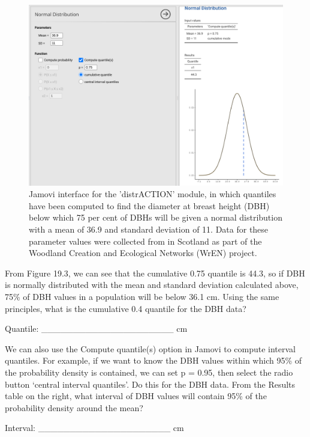 \documentclass[
]{scrbook}
\begin{document}
\begin{figure}
\includegraphics[width=1\linewidth]{img/jamovi_distrACTION_p75} \caption{Jamovi interface for the 'distrACTION' module, in which quantiles have been computed to find the diameter at breast height (DBH) below which 75 per cent of DBHs will be given a normal distribution with a mean of 36.9 and standard deviation of 11. Data for these parameter values were collected from in Scotland as part of the Woodland Creation and Ecological Networks (WrEN) project.}\label{fig:unnamed-chunk-88}
\end{figure}

From Figure 19.3, we can see that the cumulative 0.75 quantile is 44.3, so if DBH is normally distributed with the mean and standard deviation calculated above, 75\% of DBH values in a population will be below 36.1 cm.
Using the same principles, what is the cumulative 0.4 quantile for the DBH data?

Quantile: \_\_\_\_\_\_\_\_\_\_\_\_\_\_\_\_\_\_\_\_\_ cm

We can also use the Compute quantile(s) option in Jamovi to compute interval quantiles.
For example, if we want to know the DBH values within which 95\% of the probability density is contained, we can set p = 0.95, then select the radio button `central interval quantiles'.
Do this for the DBH data.
From the Results table on the right, what interval of DBH values will contain 95\% of the probability density around the mean?

Interval: \_\_\_\_\_\_\_\_\_\_\_\_\_\_\_\_\_\_\_\_\_ cm
\end{document}
